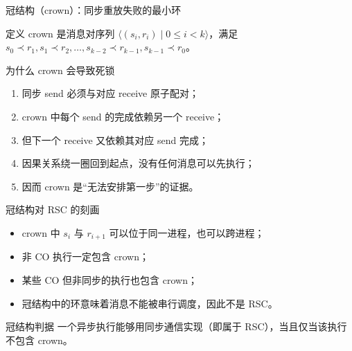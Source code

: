 \documentclass[UTF8,fontset=none,aspectratio=169,10pt]{beamer}
\begin{document}
{\begin{frame}{冠结构（crown）：同步重放失败的最小环}
\begin{center}
\end{center}
\begin{block}{定义}
crown 是消息对序列 $\langle(s_i,r_i)\mid 0\le i<k\rangle$，满足
$s_0\prec r_1,s_1\prec r_2,\ldots,s_{k-2}\prec r_{k-1},s_{k-1}\prec r_0$。
\end{block}
\end{frame}

\begin{frame}{为什么 crown 会导致死锁}
\begin{enumerate}
  \item 同步 send 必须与对应 receive 原子配对；
  \item crown 中每个 send 的完成依赖另一个 receive；
  \item 但下一个 receive 又依赖其对应 send 完成；
  \item 因果关系绕一圈回到起点，没有任何消息可以先执行；
  \item 因而 crown 是“无法安排第一步”的证据。
\end{enumerate}
\vfill
{}
\end{frame}

\begin{frame}{冠结构对 RSC 的刻画}
\begin{itemize}
  \item crown 中 $s_i$ 与 $r_{i+1}$ 可以位于同一进程，也可以跨进程；
  \item 非 CO 执行一定包含 crown；
  \item 某些 CO 但非同步的执行也包含 crown；
  \item 冠结构中的环意味着消息不能被串行调度，因此不是 RSC。
\end{itemize}
\vfill
\begin{block}{冠结构判据}
一个异步执行能够用同步通信实现（即属于 RSC），当且仅当该执行不包含 crown。
\end{block}
\end{frame}

}
\end{document}
